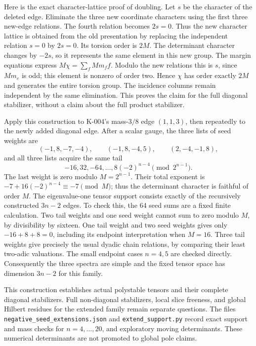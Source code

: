 Here is the exact character-lattice proof of doubling. Let $s$ be the
character of the deleted edge. Eliminate the three new coordinate
characters using the first three new-edge relations. The fourth
relation becomes $2s=0$. Thus the new character lattice is obtained
from the old presentation by replacing the independent relation
$s=0$ by $2s=0$. Its torsion order is $2M$.
The determinant character changes by $-2s$, so it represents the
same element in this new group. The margin equations express
$M\chi=\sum_f Mm_f f$. Modulo the new relations this is $s$, since
$Mm_e$ is odd; this element is nonzero of order two. Hence $\chi$
has order exactly $2M$ and generates the entire torsion group.
The incidence columns remain independent by the same elimination.
This proves the claim for the full diagonal stabilizer, without a
claim about the full product stabilizer.

Apply this construction to K-004's mass-$3/8$ edge $(1,1,3)$,
then repeatedly to the newly added diagonal edge. After a scalar
gauge, the three lists of seed weights are
\[
 (-1,8,-7,-4),\qquad(-1,8,-4,5),\qquad(2,-4,-1,8),             \tag{K-006b}
\]
and all three lists acquire the same tail
\[
             -16,32,-64,\ldots,8(-2)^{n-4}\pmod{2^{n-1}}.
                                                               \tag{K-006c}
\]
The last weight is zero modulo $M=2^{n-1}$.
Their total exponent is $-7+16(-2)^{n-4}\equiv-7\pmod M$;
thus the determinant character is faithful of order $M$.
The eigenvalue-one tensor support consists exactly of the recursively
constructed $3n-2$ edges. To check this, the 64 seed sums are a fixed
finite calculation. Two tail weights and one seed weight cannot sum
to zero modulo $M$, by divisibility by sixteen. One tail weight and
two seed weights gives only $-16+8+8=0$, including its endpoint
interpretation when $M=16$. Three tail weights give precisely the
usual dyadic chain relations, by comparing their least two-adic
valuations. The small endpoint cases $n=4,5$ are checked directly.
Consequently the three spectra are simple and the fixed tensor
space has dimension $3n-2$ for this family.

This construction establishes actual polystable tensors and their
complete diagonal stabilizers. Full non-diagonal stabilizers, local
slice freeness, and global Hilbert residues for the extended family
remain separate questions. The files
\texttt{negative\_seed\_extensions.json} and
\texttt{extend\_support.py} record exact support and mass checks for
$n=4,\ldots,20$, and exploratory moving determinants. These numerical
determinants are not promoted to global pole claims.

